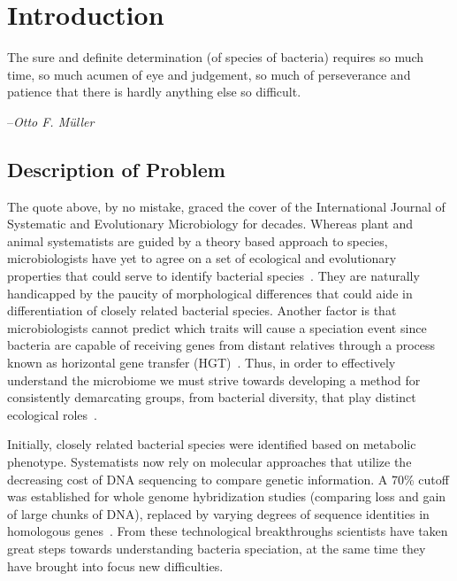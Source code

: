 \chapter{Introduction}
\begin{shadequote}
The sure and definite determination (of species of bacteria) requires so much time, so much acumen of eye and judgement, so much of perseverance and patience that there is hardly anything else so \mbox{difficult}. \par--\emph{Otto F. M\"uller}
\end{shadequote}


\section{Description of Problem}
The quote above, by no mistake, graced the cover of the International Journal of Systematic and Evolutionary Microbiology for decades.
Whereas plant and animal systematists are guided by a theory based approach to  species, microbiologists have yet to agree on a set of ecological and evolutionary properties that could serve to identify bacterial species~\cite{cohan2007systematics}.
They are naturally handicapped by the paucity of morphological differences that could aide in differentiation of closely related bacterial species.
Another factor is that microbiologists cannot predict which traits will cause a speciation event since bacteria are capable of receiving genes from distant relatives through a process known as horizontal gene transfer (HGT)~\cite{cohan2007systematics}.
Thus, in order to effectively understand the microbiome we must strive towards developing a method for consistently demarcating groups, from bacterial diversity, that play distinct ecological roles~\cite{koeppel2008identifying}.

Initially, closely related bacterial species were identified based on metabolic phenotype.
Systematists now rely on molecular approaches that utilize the decreasing cost of DNA sequencing to compare genetic information.
A 70\% cutoff was established for whole genome hybridization studies (comparing loss and gain of large chunks of DNA), replaced by varying degrees of sequence identities in homologous genes~\cite{cohan2007systematics,carlo,staley1997biodiversity}.
From these technological breakthroughs scientists have taken great steps towards understanding bacteria speciation, at the same time they have brought into focus new difficulties.

